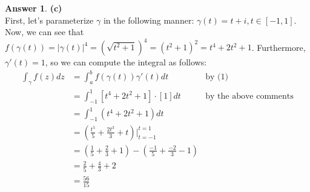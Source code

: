 \documentclass[10pt,a4paper]{article}
\theoremstyle{definition}
\newtheorem*{answer*}{Answer}
\begin{document}
\begin{answer*}{\textbf{(c)}}
\\First, let's parameterize $\gamma$ in the following manner: $\gamma(t) = t + i, t \in [-1,1]$. Now, we can see that $\displaystyle f(\gamma(t)) = |\gamma(t)|^4 = \left(\sqrt{t^2 + 1}\right)^4 = (t^2 + 1)^2 = t^4 + 2t^2 + 1$. Furthermore, $\gamma '(t) = 1$, so we can compute the integral as follows:
\begin{align*}
\int_{\gamma} f(z)dz &= \int_a^b f(\gamma(t))\gamma '(t)dt &\text{by (1)}\\
&= \int_{-1}^1 [t^4 + 2t^2 + 1]\cdot[1] dt &\text{by the above comments}\\
&= \int_{-1}^1 (t^4 + 2t^2 + 1) dt\\
&= \left(\frac{t^5}{5} + \frac{2t^3}{3} + t\right) \bigg|_{t = -1}^{t = 1}\\
&= \left(\frac{1}{5} + \frac{2}{3} + 1\right) - \left(\frac{-1}{5} + \frac{-2}{3} - 1\right)\\
&= \frac{2}{5} + \frac{4}{3} + 2\\
&= \boxed{\frac{56}{15}}
\end{align*}
\end{answer*}
\end{document}
